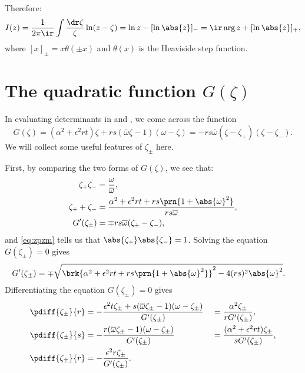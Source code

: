 \documentclass[12pt]{article}
\newcommand{\omb}{\overline{\omega}}
\newcommand{\opo}{\prn{1+\abs{\omega}^2}}
\begin{document}
Therefore:
%
\begin{equation}\label{eq:countourintresult}
  I(z) = \frac{1}{2\pi\ir}\int \frac{\dr\zeta}{\zeta} \ln(z-\zeta)
   = \ln z - [\ln\abs{z}]_-
   = \ir \arg z + [\ln\abs{z}]_+,
\end{equation}
%
where $[x]_\pm = x \theta(\pm x)$ and $\theta(x)$ is the Heaviside step function.


\section{The quadratic function \texorpdfstring{$G(\zeta)$}{G(zeta)}}\label{sec:Gamma}

In evaluating determinants in  and , we come across the function
%
\begin{equation}\label{eq:Gammadef}
  G(\zeta) = (\alpha^2+\epsilon^2rt)\zeta + rs(\omb\zeta-1)(\omega-\zeta) = - rs\omb (\zeta-\zeta_+) (\zeta-\zeta_-).
\end{equation}
%
We will collect some useful features of $\zeta_\pm$ here.

First, by comparing the two forms of $G(\zeta)$, we see that:
%
\begin{align}
\label{eq:zpzm}
  \zeta_+ \zeta_- &= \frac{\omega}{\omb},\\
  \label{eq:zppzm}
  \zeta_+ + \zeta_- &= \frac{\alpha^2+\epsilon^2rt + rs\opo}{rs\omb},\\
  \label{eq:Gprime}
  G'(\zeta_\pm) &= \mp rs\omb(\zeta_+ - \zeta_-),
\end{align}
%
and \eqref{eq:zpzm} tells us that $\abs{\zeta_+} \abs{\zeta_-}=1$.
Solving the equation $G(\zeta_\pm)=0$ gives
%
\begin{align}
\label{eq:Gprimesol}
  G'(\zeta_\pm) &= \mp\sqrt{\brk{\alpha^2+\epsilon^2rt + rs\opo}^2
       - 4(rs)^2\abs{\omega}^2}.
\end{align}
%
Differentiating the equation $G(\zeta_\pm)=0$ gives
%
\begin{equation}\label{eq:dzpmdrst}
\begin{aligned}
  \pdiff{\zeta_\pm}{r} &=
    -\frac{\epsilon^2t\zeta_\pm + s(\omb\zeta_\pm-1)(\omega-\zeta_\pm)}{G'(\zeta_\pm)}
    &&= \frac{\alpha^2\zeta_\pm}{rG'(\zeta_\pm)},\\
  \pdiff{\zeta_\pm}{s} &=
    -\frac{r(\omb\zeta_\pm-1)(\omega-\zeta_\pm)}{G'(\zeta_\pm)}
    &&= \frac{(\alpha^2+\epsilon^2rt)\zeta_\pm}{sG'(\zeta_\pm)},\\
  \pdiff{\zeta_\pm}{r} &=
    -\frac{\epsilon^2r\zeta_\pm}{G'(\zeta_\pm)}.
\end{aligned}
\end{equation}
%
\end{document}
